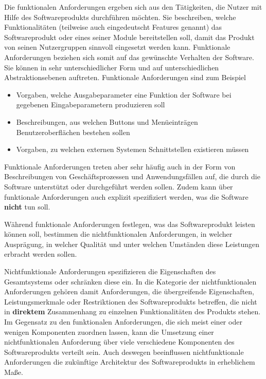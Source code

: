 
Die funktionalen Anforderungen ergeben sich aus den Tätigkeiten, die Nutzer mit Hilfe des Softwareprodukts durchführen möchten. Sie beschreiben, welche Funktionalitäten (teilweise auch eingedeutscht Features genannt) das Softwareprodukt oder eines seiner Module bereitstellen soll, damit das Produkt von seinen Nutzergruppen sinnvoll eingesetzt werden kann. Funktionale Anforderungen beziehen sich somit auf das gewünschte Verhalten der Software. Sie können in sehr unterschiedlicher Form und auf unterschiedlichen Abstraktionsebenen auftreten. Funktionale Anforderungen sind zum Beispiel 

\begin{itemize}
	\item Vorgaben, welche Ausgabeparameter eine Funktion der Software bei gegebenen Eingabeparametern produzieren soll
	\item Beschreibungen, aus welchen Buttons und Menüeinträgen Benutzeroberflächen bestehen sollen
	\item Vorgaben, zu welchen externen Systemen Schnittstellen existieren müssen
\end{itemize}

Funktionale Anforderungen treten aber sehr häufig auch in der Form von Beschreibungen von Geschäftsprozessen und Anwendungsfällen auf, die durch die Software unterstützt oder durchgeführt werden sollen. Zudem kann über funktionale Anforderungen auch explizit spezifiziert werden, was die Software \textbf{nicht} tun soll.


Während funktionale Anforderungen festlegen, was das Softwareprodukt leisten können soll, bestimmen die nichtfunktionalen Anforderungen, in welcher Ausprägung, in welcher Qualität und unter welchen Umständen diese Leistungen erbracht werden sollen.

\vspace{\baselineskip} %


\vspace{\baselineskip} %

Nichtfunktionale Anforderungen spezifizieren die Eigenschaften des Gesamtsystems oder schränken diese ein. In die Kategorie der nichtfunktionalen Anforderungen gehören damit Anforderungen, die übergreifende Eigenschaften, Leistungsmerkmale oder Restriktionen des Softwareprodukts betreffen, die nicht in \textbf{direktem} Zusammenhang zu einzelnen Funktionalitäten des Produkts stehen. Im Gegensatz zu den funktionalen Anforderungen, die sich meist einer oder wenigen Komponenten zuordnen lassen, kann die Umsetzung einer nichtfunktionalen Anforderung über viele verschiedene Komponenten des Softwareprodukts verteilt sein. Auch deswegen beeinflussen nichtfunktionale Anforderungen die zukünftige Architektur des Softwareprodukts in erheblichem Maße.

